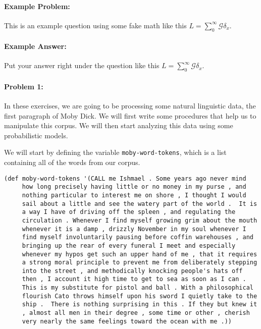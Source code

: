 \documentclass[10pt]{article}
\begin{document}
\noindent\hrulefill %

\paragraph{Example Problem:}
This is an example question using some fake math like this
$L=\sum_0^{\infty} \mathcal{G} \delta_x$.

\paragraph{Example Answer:} Put your answer right under the question like
this $L=\sum_0^{\infty} \mathcal{G} \delta_x$.

\noindent\hrulefill %

\paragraph{Problem 1:}

In these exercises, we are going to be processing some natural
linguistic data, the first paragraph of Moby Dick. We will first write
some procedures that help us to manipulate this corpus. We will then
start analyzing this data using some probabilistic models.

We will start by defining the variable \texttt{moby-word-tokens},
which is a list containing all of the words from our corpus.

\begin{lstlisting}
(def moby-word-tokens '(CALL me Ishmael . Some years ago never mind
     how long precisely having little or no money in my purse , and
     nothing particular to interest me on shore , I thought I would
     sail about a little and see the watery part of the world .  It is
     a way I have of driving off the spleen , and regulating the
     circulation . Whenever I find myself growing grim about the mouth
     whenever it is a damp , drizzly November in my soul whenever I
     find myself involuntarily pausing before coffin warehouses , and
     bringing up the rear of every funeral I meet and especially
     whenever my hypos get such an upper hand of me , that it requires
     a strong moral principle to prevent me from deliberately stepping
     into the street , and methodically knocking people's hats off
     then , I account it high time to get to sea as soon as I can .
     This is my substitute for pistol and ball . With a philosophical
     flourish Cato throws himself upon his sword I quietly take to the
     ship .  There is nothing surprising in this . If they but knew it
     , almost all men in their degree , some time or other , cherish
     very nearly the same feelings toward the ocean with me .))
\end{lstlisting}
\end{document}
